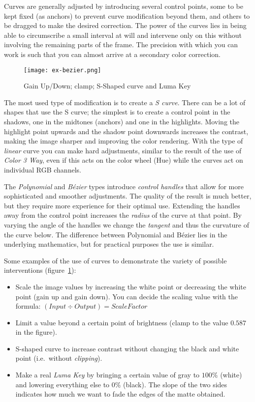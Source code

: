 Curves are generally adjusted by introducing several control points, some to be kept fixed (as anchors) to prevent curve modification beyond them, and others to be dragged to make the desired correction. The power of the curves lies in being able to circumscribe a small interval at will and intervene only on this without involving the remaining parts of the frame. The precision with which you can work is such that you can almost arrive at a secondary color correction.

\begin{figure}[htpb]
    \centering
    \texttt{[image: ex-bezier.png]}
    \caption{Gain Up/Down; clamp; S-Shaped curve and Luma Key}
    \label{fig:ex-bezier}
\end{figure}


The most used type of modification is to create a \textit{S curve}. There can be a lot of shapes that use the S curve; the simplest is to create a control point in the shadows, one in the midtones (anchors) and one in the highlights. Moving the highlight point upwards and the shadow point downwards increases the contrast, making the image sharper and improving the color rendering. With the type of \textit{linear} curve you can make hard adjustments, similar to the result of the use of \textit{Color 3 Way}, even if this acts on the color wheel (Hue) while the curves act on individual RGB channels.

The \textit{Polynomial} and \textit{Bézier} types introduce \textit{control handles} that allow for more sophisticated and smoother adjustments. The quality of the result is much better, but they require more experience for their optimal use. Extending the handles away from the control point increases the \textit{radius} of the curve at that point. By varying the angle of the handles we change the \textit{tangent} and thus the curvature of the curve below. The difference between Polynomial and Bézier lies in the underlying mathematics, but for practical purposes the use is similar.

Some examples of the use of curves to demonstrate the variety of possible interventions (figure~\ref{fig:ex-bezier}):

\begin{itemize}
    \item Scale the image values by increasing the white point or decreasing the white point (gain up and gain down).
        You can decide the scaling value with the formula: $(Input \div Output) = Scale Factor$
    \item Limit a value beyond a certain point of brightness (clamp to the value $0.587$ in the figure).
    \item S-shaped curve to increase contrast without changing the black and white point (i.e.\ without \textit{clipping}).
    \item Make a real \textit{Luma Key} by bringing a certain value of gray to $100\%$ (white) and lowering everything else to $0\%$ (black). The slope of the two sides indicates how much we want to fade the edges of the matte obtained.
\end{itemize}

